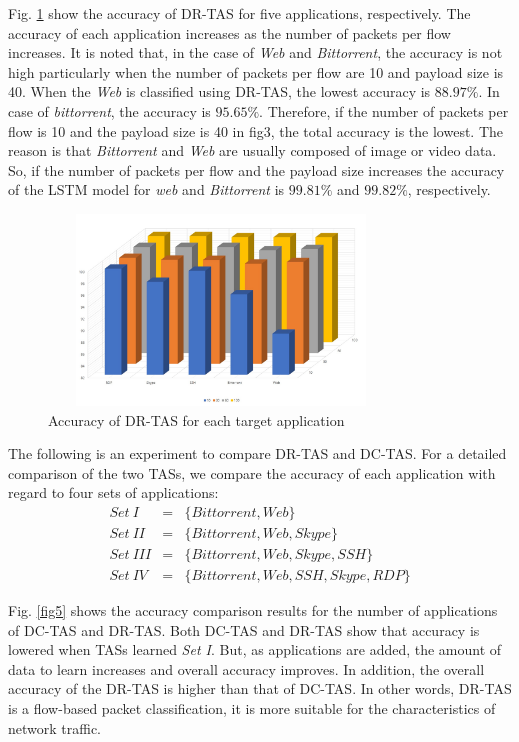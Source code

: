 \documentclass[10pt, twoside, jounal]{IEEEtran}
\begin{document}
Fig. \ref{fig4} show the accuracy of DR-TAS for five applications, respectively.
The accuracy of each application increases as the number of packets per flow increases.
It is noted that, in the case of {\it Web} and {\it Bittorrent}, the accuracy is not high particularly when the number of packets per flow are 10 and payload size is 40.
When the {\it Web} is classified using DR-TAS, the lowest accuracy is $88.97\%$.
In case of {\it bittorrent}, the accuracy is $95.65\%$.
Therefore, if the number of packets per flow is 10 and the payload size is 40 in fig3, the total accuracy is the lowest.
The reason is that {\it Bittorrent} and {\it Web} are usually composed of image or video data.
So, if the number of packets per flow and the payload size increases the accuracy of the LSTM model for {\it web} and {\it Bittorrent} is $99.81\%$ and $99.82\%$, respectively.

\begin{figure}[!t]
\centering
\setlength{\abovecaptionskip}{0pt}
\setlength{\belowcaptionskip}{0pt}
{
\includegraphics[width=3.6in, height=2.0in]{fig4.jpg}
\caption{Accuracy of DR-TAS for each target application}
\label{fig4}
}
\end{figure}

The following is an experiment to compare DR-TAS and DC-TAS.
For a detailed comparison of the two TASs, we compare the accuracy of each application with regard to four sets of applications:
\begin{eqnarray}
    Set~I&=&\{Bittorrent, Web\} \\
    Set~II&=&\{Bittorrent, Web, Skype\} \\
    Set~III&=&\{Bittorrent, Web, Skype, SSH\} \\
    Set~IV&=&\{Bittorrent, Web, SSH, Skype, RDP\}
\end{eqnarray}

Fig. \ref{fig5} shows the accuracy comparison results for the number of applications of DC-TAS and DR-TAS.
Both DC-TAS and DR-TAS show that accuracy is lowered when TASs learned {\it Set I}.
But, as applications are added, the amount of data to learn increases and overall accuracy improves.
In addition, the overall accuracy of the DR-TAS is higher than that of DC-TAS.
In other words, DR-TAS is a flow-based packet classification, it is more suitable for the characteristics of network traffic.
\end{document}
